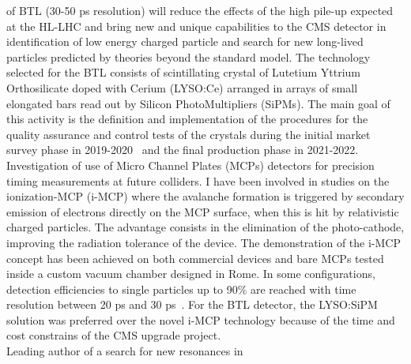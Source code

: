\documentclass[10pt, a4paper]{article}
\newcommand{\years}[1]{\marginnote{\hskip-0.2in{\scriptsize #1}}}
\begin{document}
of BTL (30-50 ps
resolution) will reduce the effects of the high pile-up expected at
the HL-LHC and bring new and unique capabilities to the CMS detector 
in identification of low energy charged particle and search for
new long-lived particles predicted by theories beyond the standard model.
The technology selected for the BTL consists of scintillating crystal of
Lutetium Yttrium Orthosilicate doped with Cerium (LYSO:Ce) arranged in 
arrays of small elongated bars read out by Silicon PhotoMultipliers
(SiPMs). The main goal of this activity is the definition and implementation 
of the procedures for the quality assurance and control tests of the
crystals during the initial market survey phase in
2019-2020~\cite{DN-20-010} and the 
final production phase in 2021-2022.\\ [1em] 
\years{03/2014 - 09/2017} Investigation of use of Micro Channel Plates
(MCPs) detectors for precision timing measurements at future colliders. I have been
involved in studies on the ionization-MCP (i-MCP) where the
avalanche formation is triggered by secondary emission of electrons
directly on the MCP surface, when this is hit by relativistic charged
particles. The advantage consists in the elimination of the
photo-cathode, improving the radiation tolerance of the device. The
demonstration of the i-MCP concept has been achieved on both
commercial devices and bare MCPs tested inside a custom vacuum  
chamber designed in Rome. In some configurations, detection
efficiencies to single particles up to 90\% are reached with time
resolution between 20 ps and 30
ps~\cite{Brianza:2015jia,Barnyakov:2017twj,Barnyakov:2017tak,Barnyakov:2017yrj,Barnyakov:2017qnb}. 
For the BTL detector, the LYSO:SiPM solution was preferred over the 
novel i-MCP technology because of the time and cost constrains 
of the CMS upgrade project. \\ [1em]
\years{09/2018 - today}Leading author of a search for new resonances in
\end{document}
